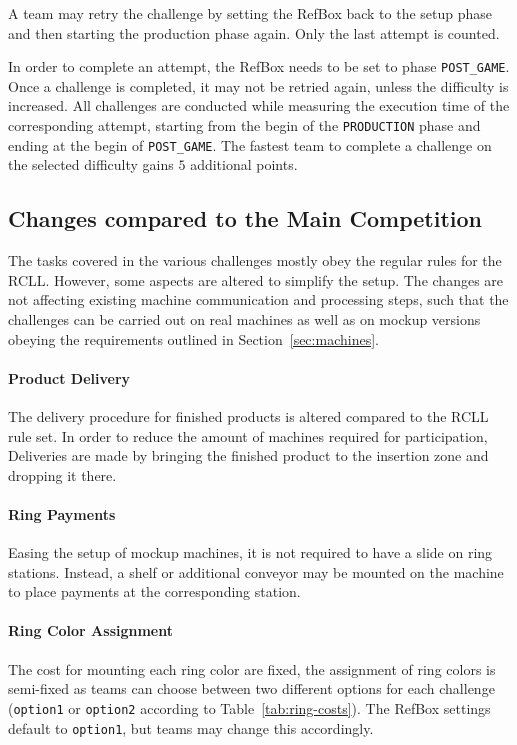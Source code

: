 \documentclass[12pt,twoside]{article}
\newcommand{\refsec}[1]{Section~\ref{#1}}
\newcommand{\reftab}[1]{Table~\ref{#1}}
\begin{document}
A team may retry the challenge by setting the RefBox back to the setup phase
and then starting the production phase again.
Only the last attempt is counted.

In order to complete an attempt, the RefBox needs to be set to phase
\texttt{POST\_GAME}.
Once a challenge is completed, it may not be retried again,
unless the difficulty is increased.
All challenges are conducted while measuring the execution time of the
corresponding attempt, starting from the begin of the \texttt{PRODUCTION} phase
and ending at the begin of \texttt{POST\_GAME}.
The fastest team to complete a challenge on the selected difficulty gains $5$
additional points.

\subsection{Changes compared to the Main Competition}
The tasks covered in the various challenges mostly obey the regular rules
for the \ac{RCLL}. However, some aspects are altered to simplify the setup.
The changes are not affecting existing machine communication and processing
steps, such that the challenges can be carried out on real machines as well as
on mockup versions obeying the requirements outlined in \refsec{sec:machines}.

\paragraph{Product Delivery}
The delivery procedure for finished products is altered compared to the
\ac{RCLL} rule set. In order to reduce the amount of machines required
for participation, Deliveries are made by bringing the finished product
to the insertion zone and dropping it there.

\paragraph{Ring Payments}
Easing the setup of mockup machines, it is not required to have a slide
on ring stations. Instead, a shelf or additional conveyor may be mounted on the
machine to place payments at the corresponding station.

\paragraph{Ring Color Assignment}
The cost for mounting each ring color are fixed, the assignment of ring colors
is semi-fixed as teams can choose between two different options for each
challenge (\texttt{option1} or \texttt{option2} according to
\reftab{tab:ring-costs}).
The RefBox settings default to \texttt{option1}, but teams may change this
accordingly.
\end{document}
